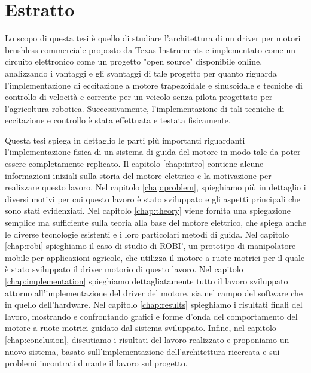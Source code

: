 \newcommand{\estrattoname}{Estratto}
\addcontentsline{toc}{chapter}{\estrattoname}

\begingroup
\let\clearpage\relax
\let\cleardoublepage\relax
\let\cleardoublepage\relax

\chapter*{Estratto}
Lo scopo di questa tesi è quello di studiare l'architettura di un driver per motori brushless commerciale proposto da Texas Instruments e implementato come un circuito elettronico come un progetto "open source" disponibile online, analizzando i vantaggi e gli svantaggi di tale progetto per quanto riguarda l'implementazione di eccitazione a motore trapezoidale e sinusoidale e tecniche di controllo di velocità e corrente per un veicolo senza pilota progettato per l'agricoltura robotica. Successivamente, l'implementazione di tali tecniche di eccitazione e controllo è stata effettuata e testata fisicamente.

Questa tesi spiega in dettaglio le parti più importanti riguardanti l'implementazione fisica di un sistema di guida del motore in modo tale da poter essere completamente replicato. Il capitolo \ref{chap:intro} contiene alcune informazioni iniziali sulla storia del motore elettrico e la motivazione per realizzare questo lavoro. Nel capitolo \ref{chap:problem}, spieghiamo più in dettaglio i diversi motivi per cui questo lavoro è stato sviluppato e gli aspetti principali che sono stati evidenziati. Nel capitolo \ref{chap:theory} viene fornita una spiegazione semplice ma sufficiente sulla teoria alla base del motore elettrico, che spiega anche le diverse tecnologie esistenti e i loro particolari metodi di guida. Nel capitolo \ref{chap:robi} spieghiamo il caso di studio di ROBI', un prototipo di manipolatore mobile per applicazioni agricole, che utilizza il motore a ruote motrici per il quale è stato sviluppato il driver motorio di questo lavoro. Nel capitolo \ref{chap:implementation} spieghiamo dettagliatamente tutto il lavoro sviluppato attorno all'implementazione del driver del motore, sia nel campo del software che in quello dell'hardware. Nel capitolo \ref{chap:results} spieghiamo i risultati finali del lavoro, mostrando e confrontando grafici e forme d'onda del comportamento del motore a ruote motrici guidato dal sistema sviluppato. Infine, nel capitolo \ref{chap:conclusion}, discutiamo i risultati del lavoro realizzato e proponiamo un nuovo sistema, basato sull'implementazione dell'architettura ricercata e sui problemi incontrati durante il lavoro sul progetto.


\endgroup

